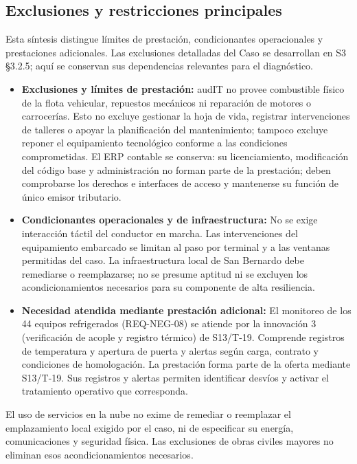 \subsection{Exclusiones y restricciones principales}\label{sec:2-exclusiones}

Esta síntesis distingue límites de prestación, condicionantes operacionales y prestaciones adicionales. Las exclusiones detalladas del Caso se desarrollan en S3 §3.2.5; aquí se conservan sus dependencias relevantes para el diagnóstico.

\begin{itemize}
  \item \textbf{Exclusiones y límites de prestación:} audIT no provee combustible físico de la flota vehicular, repuestos mecánicos ni reparación de motores o carrocerías. Esto no excluye gestionar la hoja de vida, registrar intervenciones de talleres o apoyar la planificación del mantenimiento; tampoco excluye reponer el equipamiento tecnológico conforme a las condiciones comprometidas. El ERP contable se conserva: su licenciamiento, modificación del código base y administración no forman parte de la prestación; deben comprobarse los derechos e interfaces de acceso y mantenerse su función de único emisor tributario.
  \item \textbf{Condicionantes operacionales y de infraestructura:} No se exige interacción táctil del conductor en marcha. Las intervenciones del equipamiento embarcado se limitan al paso por terminal y a las ventanas permitidas del caso. La infraestructura local de San Bernardo debe remediarse o reemplazarse; no se presume aptitud ni se excluyen los acondicionamientos necesarios para su componente de alta resiliencia.
  \item \textbf{Necesidad atendida mediante prestación adicional:} El monitoreo de los 44 equipos refrigerados (REQ-NEG-08) se atiende por la innovación 3 (verificación de acople y registro térmico) de S13/T-19. Comprende registros de temperatura y apertura de puerta y alertas según carga, contrato y condiciones de homologación. La prestación forma parte de la oferta mediante S13/T-19. Sus registros y alertas permiten identificar desvíos y activar el tratamiento operativo que corresponda.
\end{itemize}

\vspace{0.4cm}
El uso de servicios en la nube no exime de remediar o reemplazar el emplazamiento local exigido por el caso, ni de especificar su energía, comunicaciones y seguridad física. Las exclusiones de obras civiles mayores no eliminan esos acondicionamientos necesarios.

